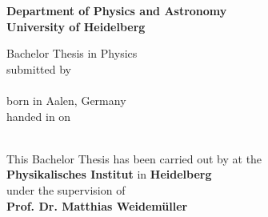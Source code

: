 \begin{titlepage}
\begin{center}
\makeatletter

\Large\textbf{Department of Physics and Astronomy\\
University of Heidelberg}

\vfill

\normalsize
Bachelor Thesis in Physics\\
\normalsize
submitted by\\[0.5cm]
\Large
\textbf{\@author}\\
\normalsize
born in Aalen, Germany\\[0.5cm]
\normalsize
handed in on\\
\Large
\textbf{\@date}\\[0.5cm]
\normalsize


\cleardoublepage
\thispagestyle{empty}


\LARGE\textbf{\@title}

\vfill

\normalsize
This Bachelor Thesis has been carried out by \@author{} at the\\
\textbf{Physikalisches Institut} in \textbf{Heidelberg}\\
under the supervision of\\
\textbf{Prof. Dr. Matthias Weidemüller}

\makeatother
\end{center}
\end{titlepage}
